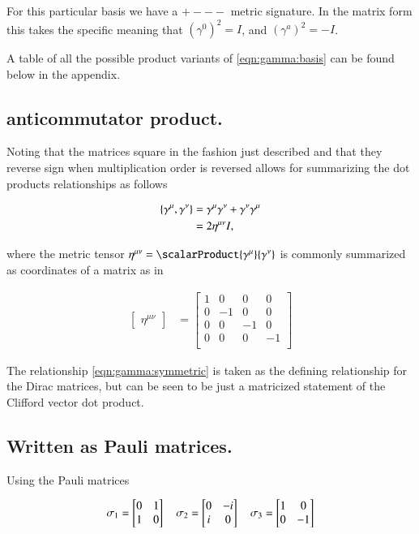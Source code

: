 For this particular basis we have a $+---$ metric signature.  In the matrix form this takes the specific meaning that $(\gamma^0)^2 = I$, and $(\gamma^a)^2 = -I$.

A table of all the possible product variants of \ref{eqn:gamma:basis} can be found below in the appendix.

\subsection{anticommutator product. }

Noting that the matrices square in the fashion just described and that they reverse sign when multiplication order is reversed allows for summarizing the dot products relationships as follows

\begin{align}\label{eqn:gamma:symmetric}
{\left\{{\gamma^\mu},{\gamma^\nu}\right\}} 
&= {\gamma^\mu}{\gamma^\nu} + {\gamma^\nu}{\gamma^\mu} \\
&= 2 \eta^{\mu\nu} I,
\end{align}

where the metric tensor $\eta^{\mu\nu} = \scalarProduct{\gamma^\mu}{\gamma^\nu}$ is commonly summarized as coordinates of a matrix as in

\begin{align*}
\begin{bmatrix}
\eta^{\mu\nu}
\end{bmatrix}
&=
\begin{bmatrix}
1 & 0 & 0 & 0 \\
0 & -1 & 0 & 0 \\
0 & 0 & -1 & 0 \\
0 & 0 & 0 & -1 \\
\end{bmatrix}
\end{align*}

The relationship \ref{eqn:gamma:symmetric} is taken as the defining relationship for the Dirac matrices, but can be seen to be just a matricized statement of the Clifford vector dot product.

\subsection{Written as Pauli matrices. }

Using the Pauli matrices

\begin{align}
\sigma_1 = \begin{bmatrix} 0 & 1 \\ 1 & 0 \\ \end{bmatrix} \quad \sigma_2 = \begin{bmatrix} 0 & -i \\ i & 0 \\ \end{bmatrix} \quad \sigma_3 = \begin{bmatrix} 1 & 0 \\ 0 & -1 \\ \end{bmatrix}
\end{align}

